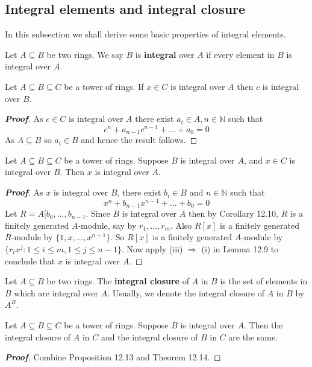 \subsection{Integral elements and integral closure}
In this subsection we shall derive some basic properties of integral elements.
\begin{definition} Let $A \subseteq B$ be two rings. We say $B$ is {\bf integral} over $A$ if every element in $B$ is integral over $A$.
\end{definition}
\begin{proposition} Let $A \subseteq B \subseteq C$ be a tower of rings. If $x \in C$ is integral over $A$ then $c$ is integral over $B$.
\end{proposition}
\begin{proof}[\bf Proof] As $c \in C$ is integral over $A$ there exist $a_i \in A, n \in \mathbb{N}$ such that
$$c^n+a_{n-1}c^{n-1}+\ldots+a_0=0$$
As $A \subseteq B$ so $a_i \in B$ and hence the result follows.
\end{proof}
\begin{theorem} Let $A \subseteq B \subseteq C$ be a tower of rings. Suppose $B$ is integral over $A$, and $x \in C$ is integral over $B$. Then $x$ is integral over $A$.
\end{theorem}
\begin{proof}[\bf Proof] As $x$ is integral over $B$, there exist $b_i \in B$ and $n \in \mathbb{N}$ such that
$$x^n + b_{n-1}x^{n-1}+\ldots+b_0=0$$
Let $R=A[b_0,\ldots,b_{n-1}$. Since $B$ is integral over $A$ then by Corollary 12.10, $R$ is a finitely generated $A$-module, say by $r_1,\ldots,r_m$. Also $R[x]$ is a finitely generated $R$-module by $\{1,x,\ldots,x^{n-1}\}$. So $R[x]$ is a finitely generated $A$-module by $\{r_ix^j: 1 \le i \le m, 1 \le j \le n-1\}$. Now apply
(iii) $\Rightarrow$ (i) in Lemma 12.9 to conclude that $x$ is integral over $A$.
\end{proof}
\begin{definition} Let $A \subseteq B$ be two rings. The {\bf integral closure} of $A$ in $B$ is the set of elements in $B$ which are integral over $A$. Usually, we denote the integral closure of $A$ in $B$ by $A^B$.
\end{definition}
\begin{corollary} Let $A \subseteq B \subseteq C$ be a tower of rings. Suppose $B$ is integral over $A$. Then the integral closure of $A$ in $C$ and the integral closure of $B$ in $C$ are the same.
\end{corollary}
\begin{proof}[\bf Proof] Combine Proposition 12.13 and Theorem 12.14.
\end{proof}
